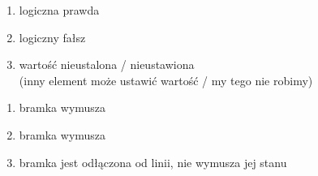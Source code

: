 \documentclass[11pt,aspectratio=169]{beamer}
\begin{document}
\begin{frame}[fragile]

\begin{enumerate}
	\item logiczna prawda
	\item logiczny fałsz
	\item wartość nieustalona / nieustawiona \\
		{\small(inny element może ustawić wartość / my tego nie robimy)}
\end{enumerate}
\vspace{17pt}
\begin{enumerate}
	\item bramka wymusza 
	\item bramka wymusza 
	\item bramka jest odłączona od linii, nie wymusza jej stanu
\end{enumerate}

\end{frame}
\end{document}
